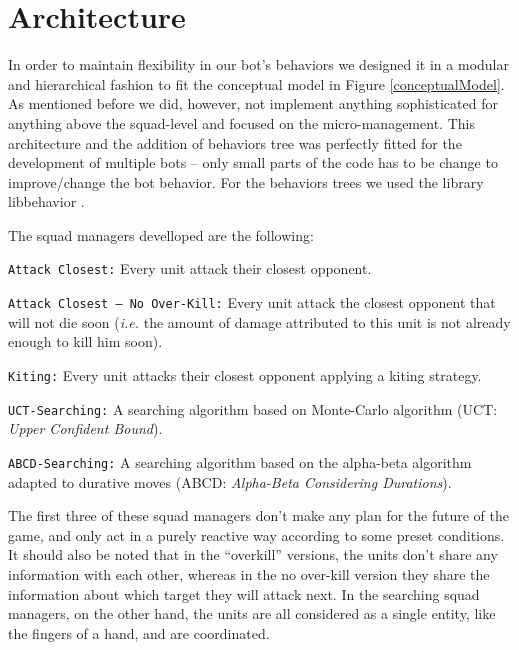 \section{Architecture}
In order to maintain flexibility in our bot's behaviors we designed it in a modular and hierarchical fashion to fit the conceptual model in Figure \ref{conceptualModel}. As mentioned before we did, however, not implement anything sophisticated for anything above the squad-level and focused on the micro-management.
This architecture and the addition of behaviors tree was perfectly fitted for the development of multiple bots -- only small parts of the code has to be change to improve/change the bot behavior.
For the behaviors trees we used the library libbehavior \cite{libbehavior}.

The squad managers develloped are the following:
\begin{shortitem}
\item \texttt{Attack Closest:} Every unit attack their closest opponent.
\item \texttt{Attack Closest -- No Over-Kill:} Every unit attack the closest opponent that will not die soon (\emph{i.e.} the amount of damage attributed to this unit is not already enough to kill him soon).
\item \texttt{Kiting:} Every unit attacks their closest opponent applying a kiting strategy.
\item \texttt{UCT-Searching:} A searching algorithm based on Monte-Carlo algorithm (UCT: \emph{Upper Confident Bound}).
\item \texttt{ABCD-Searching:} A searching algorithm based on the alpha-beta algorithm adapted to durative moves (ABCD: \emph{Alpha-Beta Considering Durations}).
\end{shortitem}

The first three of these squad managers don't make any plan for the future of the game, and only act in a purely reactive way according to some preset conditions. 
It should also be noted that in the ``overkill'' versions, the units don't share any information with each other, whereas in the no over-kill version they share the information about which target they will attack next. 
In the searching squad managers, on the other hand, the units are all considered as a single entity, like the fingers of a hand, and are coordinated.
